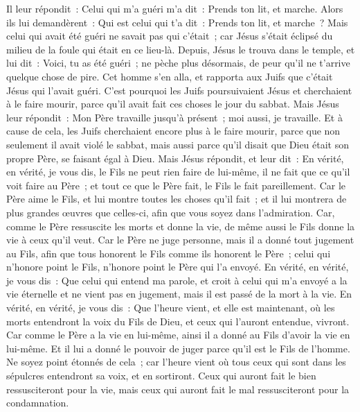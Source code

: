 \begin{multicols}{2}
Il leur répondit~: Celui qui m'a guéri m'a dit~: Prends ton lit, et marche.
Alors ils lui demandèrent~: Qui est celui qui t'a dit~: Prends ton lit, et marche~?
Mais celui qui avait été guéri ne savait pas qui c'était~; car Jésus s'était éclipsé du milieu de la foule qui était en ce lieu-là.
Depuis, Jésus le trouva dans le temple, et lui dit~: Voici, tu as été guéri~; ne pèche plus désormais, de peur qu'il ne t'arrive quelque chose de pire.
Cet homme s'en alla, et rapporta aux Juifs que c'était Jésus qui l'avait guéri.
C'est pourquoi les Juifs poursuivaient Jésus et cherchaient à le faire mourir, parce qu'il avait fait ces choses le jour du sabbat.
Mais Jésus leur répondit~: Mon Père travaille jusqu'à présent~; moi aussi, je travaille.
Et à cause de cela, les Juifs cherchaient encore plus à le faire mourir, parce que non seulement il avait violé le sabbat, mais aussi parce qu'il disait que Dieu était son propre Père, se faisant égal à Dieu.
Mais Jésus répondit, et leur dit~: En vérité, en vérité, je vous dis, le Fils ne peut rien faire de lui-même, il ne fait que ce qu'il voit faire au Père~; et tout ce que le Père fait, le Fils le fait pareillement.
Car le Père aime le Fils, et lui montre toutes les choses qu'il fait~; et il lui montrera de plus grandes œuvres que celles-ci, afin que vous soyez dans l'admiration.
Car, comme le Père ressuscite les morts et donne la vie, de même aussi le Fils donne la vie à ceux qu'il veut.
Car le Père ne juge personne, mais il a donné tout jugement au Fils,
afin que tous honorent le Fils comme ils honorent le Père~; celui qui n'honore point le Fils, n'honore point le Père qui l'a envoyé.
En vérité, en vérité, je vous dis~: Que celui qui entend ma parole, et croit à celui qui m'a envoyé a la vie éternelle et ne vient pas en jugement, mais il est passé de la mort à la vie.
En vérité, en vérité, je vous dis~: Que l'heure vient, et elle est maintenant, où les morts entendront la voix du Fils de Dieu, et ceux qui l'auront entendue, vivront.
Car comme le Père a la vie en lui-même, ainsi il a donné au Fils d'avoir la vie en lui-même.
Et il lui a donné le pouvoir de juger parce qu'il est le Fils de l'homme.
Ne soyez point étonnés de cela~; car l'heure vient où tous ceux qui sont dans les sépulcres entendront sa voix, et en sortiront.
 Ceux qui auront fait le bien ressusciteront pour la vie, mais ceux qui auront fait le mal ressusciteront pour la condamnation.

\end{multicols}
